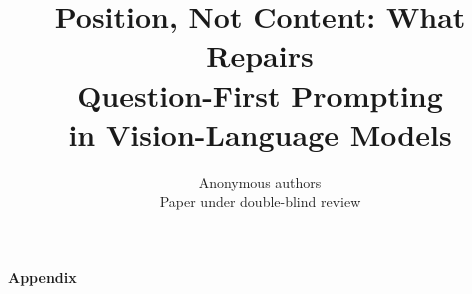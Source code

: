 \documentclass{article}
\title{\hyphenpenalty=10000\exhyphenpenalty=10000
Position, Not Content: What Repairs\\
Question-First Prompting\\
in Vision-Language Models}
\author{Anonymous authors\\Paper under double-blind review}
\begin{document}
\maketitle















\newpage
\appendix
\begin{center}
  {\LARGE\bfseries Appendix}
\end{center}

\end{document}
